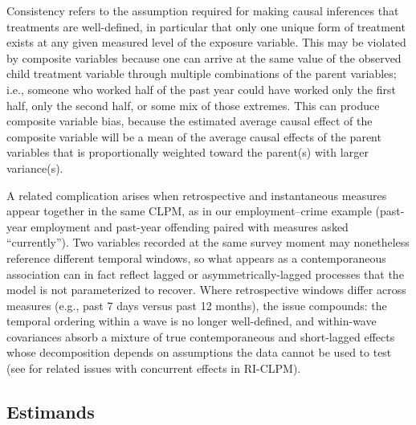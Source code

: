 \documentclass[
  letterpaper,
  DIV=11,
  numbers=noendperiod]{scrartcl}
\begin{document}
Consistency refers to the assumption required for making causal
inferences that treatments are well-defined, in particular that only one
unique form of treatment exists at any given measured level of the
exposure variable. This may be violated by composite variables because
one can arrive at the same value of the observed child treatment
variable through multiple combinations of the parent variables; i.e.,
someone who worked half of the past year could have worked only the
first half, only the second half, or some mix of those extremes. This
can produce composite variable bias, because the estimated average
causal effect of the composite variable will be a mean of the average
causal effects of the parent variables that is proportionally weighted
toward the parent(s) with larger variance(s).

A related complication arises when retrospective and instantaneous
measures appear together in the same CLPM, as in our employment--crime
example (past-year employment and past-year offending paired with
measures asked ``currently''). Two variables recorded at the same survey
moment may nonetheless reference different temporal windows, so what
appears as a contemporaneous association can in fact reflect lagged or
asymmetrically-lagged processes that the model is not parameterized to
recover. Where retrospective windows differ across measures (e.g., past
7 days versus past 12 months), the issue compounds: the temporal
ordering within a wave is no longer well-defined, and within-wave
covariances absorb a mixture of true contemporaneous and short-lagged
effects whose decomposition depends on assumptions the data cannot be
used to test (see  for related issues with concurrent effects in RI-CLPM).

\subsection{Estimands}\label{estimands}
\end{document}
